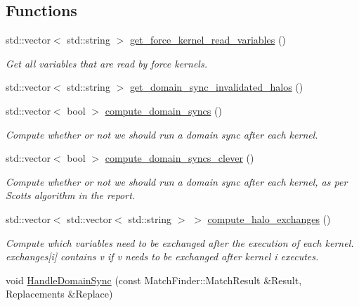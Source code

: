 \subsection*{Functions}
\begin{DoxyCompactItemize}
\item 
std\+::vector$<$ std\+::string $>$ \mbox{\hyperlink{namespacews2st_1_1dependency__detection_a9bcbdab5f532436efdc9e10c42d24eaa}{get\+\_\+force\+\_\+kernel\+\_\+read\+\_\+variables}} ()
\begin{DoxyCompactList}\small\item\em Get all variables that are read by force kernels. \end{DoxyCompactList}\item 
std\+::vector$<$ std\+::string $>$ \mbox{\hyperlink{namespacews2st_1_1dependency__detection_a46a6c80d29092ee17d43942908165ebc}{get\+\_\+domain\+\_\+sync\+\_\+invalidated\+\_\+halos}} ()
\item 
std\+::vector$<$ bool $>$ \mbox{\hyperlink{namespacews2st_1_1dependency__detection_ad1cd2b8bb6701a935a701247e3a9513a}{compute\+\_\+domain\+\_\+syncs}} ()
\begin{DoxyCompactList}\small\item\em Compute whether or not we should run a domain sync after each kernel. \end{DoxyCompactList}\item 
std\+::vector$<$ bool $>$ \mbox{\hyperlink{namespacews2st_1_1dependency__detection_a28f5ee92a11488823ff4d4400e5aa9db}{compute\+\_\+domain\+\_\+syncs\+\_\+clever}} ()
\begin{DoxyCompactList}\small\item\em Compute whether or not we should run a domain sync after each kernel, as per Scott\textquotesingle{}s algorithm in the report. \end{DoxyCompactList}\item 
std\+::vector$<$ std\+::vector$<$ std\+::string $>$ $>$ \mbox{\hyperlink{namespacews2st_1_1dependency__detection_a2b9570e91f83523fedfd436f165b8295}{compute\+\_\+halo\+\_\+exchanges}} ()
\begin{DoxyCompactList}\small\item\em Compute which variables need to be exchanged after the execution of each kernel. exchanges\mbox{[}i\mbox{]} contains v if v needs to be exchanged after kernel i executes. \end{DoxyCompactList}\item 
void \mbox{\hyperlink{namespacews2st_1_1dependency__detection_aa7e279bcb7d4659203bc4055d7c783c1}{Handle\+Domain\+Sync}} (const Match\+Finder\+::\+Match\+Result \&Result, Replacements \&Replace)

\end{DoxyCompactItemize}
